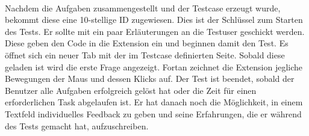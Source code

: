 \\
Nachdem die Aufgaben zusammengestellt und der Testcase erzeugt wurde, bekommt diese eine 10-stellige ID zugewiesen. Dies ist der Schlüssel zum Starten des Tests. Er sollte mit ein paar Erläuterungen an die Testuser geschickt werden. Diese geben den Code in die Extension ein und beginnen damit den Test. Es öffnet sich ein neuer Tab mit der im Testcase definierten Seite. Sobald diese geladen ist wird die erste Frage angezeigt. Fortan zeichnet die Extension jegliche Bewegungen der Maus und dessen Klicks auf. Der Test ist beendet, sobald der Benutzer alle Aufgaben erfolgreich gelöst hat oder die Zeit für einen erforderlichen Task abgelaufen ist. Er hat danach noch die Möglichkeit, in einem Textfeld individuelles Feedback zu geben und seine Erfahrungen, die er während des Tests gemacht hat, aufzuschreiben.